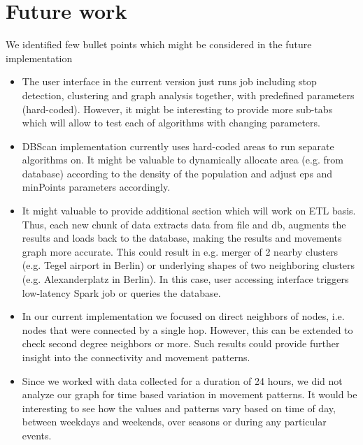 \chapter{Future work}
\label{cha:future}

We identified few bullet points which might be considered in the future implementation

\begin{itemize}  
\item The user interface in the current version just runs job including stop detection, clustering and graph analysis together, with predefined parameters (hard-coded). However, it might be interesting to provide more sub-tabs which will allow to test each of algorithms with changing parameters. 
\item DBScan implementation currently uses hard-coded areas to run separate algorithms on. It might be valuable to dynamically allocate area (e.g. from database) according to the density of the population and adjust eps and minPoints parameters accordingly.
\item It might valuable to provide additional section which will work on ETL basis. Thus, each new chunk of data extracts data from file and db, augments the results and loads back to the database, making the results and movements graph more accurate. This could result in e.g. merger of 2 nearby clusters (e.g. Tegel airport in Berlin) or underlying shapes of two neighboring clusters (e.g. Alexanderplatz in Berlin). In this case, user accessing interface triggers low-latency Spark job or queries the database.
\item In our current implementation we focused on direct neighbors of nodes, i.e. nodes that were connected by a single hop. However, this can be extended to check second degree neighbors or more. Such results could provide further insight into the connectivity and movement patterns.
\item Since we worked with data collected for a duration of 24 hours, we did not analyze our graph for time based variation in movement patterns. It would be interesting to see how the values and patterns vary based on time of day, between weekdays and weekends, over seasons or during any particular events.
\end{itemize}